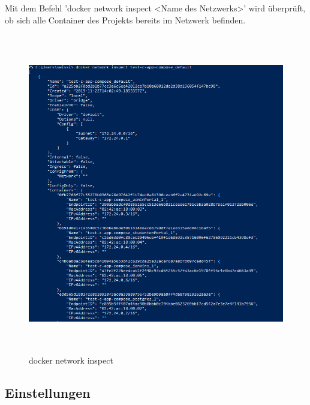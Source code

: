 \documentclass[a4paper,12pt,oneside]{book}
\begin{document}
Mit dem Befehl 'docker network inspect <Name des Netzwerks>' wird überprüft, ob sich alle Container des Projekts bereits im Netzwerk befinden.
\begin{figure}[h!]
	\begin{center}
		\includegraphics[width=14cm, height=14cm]{network-inspect.PNG}
		\caption{docker network inspect} 
		\label{docker network inspect} 
	\end{center}
\end{figure}
\subsection{Einstellungen}
\end{document}
